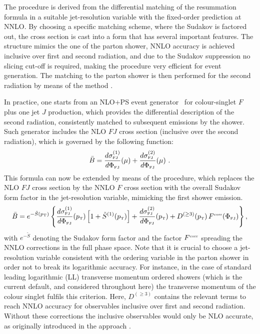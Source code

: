 \documentclass[11pt,a4paper]{article}
\begin{document}
The \minnlo{} procedure is derived from the differential matching of the resummation 
formula in a suitable jet-resolution variable with the fixed-order prediction at NNLO.
By choosing a specific matching scheme, where the Sudakov is factored out, the 
cross section is cast into a form that has several important features. The structure
mimics the one of the parton shower, NNLO accuracy is achieved inclusive over
first and second radiation, and due to the Sudakov suppression no slicing cut-off
is required, making the procedure very efficient for event generation.
The matching to the parton shower is then performed for the second radiation
by means of the \POWHEG{} method \cite{frixione:2007vw}.

In practice, one starts from an NLO+PS \POWHEG{} event
generator~\cite{alioli:2010xd} for colour-singlet $F$ plus one jet $J$
production, which provides the differential description of the 
second radiation, consistently matched to subsequent emissions
by the shower. Such generator includes the NLO $FJ$ cross section 
(inclusive over the second radiation), which is governed by the following
function:
\begin{equation}
  \bar{B} = \frac{d\sigma_{\scriptscriptstyle\rm
      FJ}^{(1)}}{d\Phi_{\scriptscriptstyle\rm FJ}}\!\left(\mu\right) +
  \frac{d\sigma_{\scriptscriptstyle\rm
      FJ}^{(2)}}{d\Phi_{\scriptscriptstyle\rm FJ}}\!\left(\mu\right)\,.
\end{equation}
This formula can now be extended by means of the \minnlo{} procedure,
which replaces the NLO $FJ$ cross section by the NNLO $F$ cross section
with the overall Sudakov form factor in the jet-resolution variable, mimicking
the first shower emission.
\begin{equation}
  \label{MiNNLOPS_cross_section}
  \bar{B} = e^{-\tilde{S}\left(p_{\scriptscriptstyle\rm T}\right)}
  \left\{\frac{d\sigma_{\scriptscriptstyle\rm
      FJ}^{(1)}}{d\Phi_{\scriptscriptstyle\rm
      FJ}}\!\left(p_{\scriptscriptstyle\rm T}\right) \left[1 +
    \tilde{S}^{(1)}\!\left(p_{\scriptscriptstyle\rm T}\right)\right] +
  \frac{d\sigma_{\scriptscriptstyle\rm
      FJ}^{(2)}}{d\Phi_{\scriptscriptstyle\rm
      FJ}}\!\left(p_{\scriptscriptstyle\rm T}\right) + D^{(\geq
    3)}\!\left(p_{\scriptscriptstyle\rm T}\right)
  F^{\scriptscriptstyle\rm corr}\!\left(\Phi_{\scriptscriptstyle\rm
    FJ}\right)\right\},
\end{equation}
with $e^{-\tilde{S}}$ denoting the Sudakov form factor and 
the factor $F^{\scriptscriptstyle\rm corr}$ spreading the NNLO corrections
in the full phase space.
Note that it is crucial to choose a jet-resolution variable 
consistent with the ordering variable in the parton shower in order not to break
its logarithmic accuracy. For instance, in the case of standard leading logarithmic (LL) 
transverse momentum ordered showers (which is the current default, and 
considered throughout here) the transverse 
momentum of the colour singlet fulfils this criterion.
Here, $D^{(\geq 3)}$ contains the relevant terms to reach 
NNLO accuracy for observables inclusive over first and second radiation.
Without these corrections the inclusive observables would only be NLO accurate,
as originally introduced in the \minlo{} approach \cite{hamilton:2012rf,hamilton:2012np}.
\end{document}
